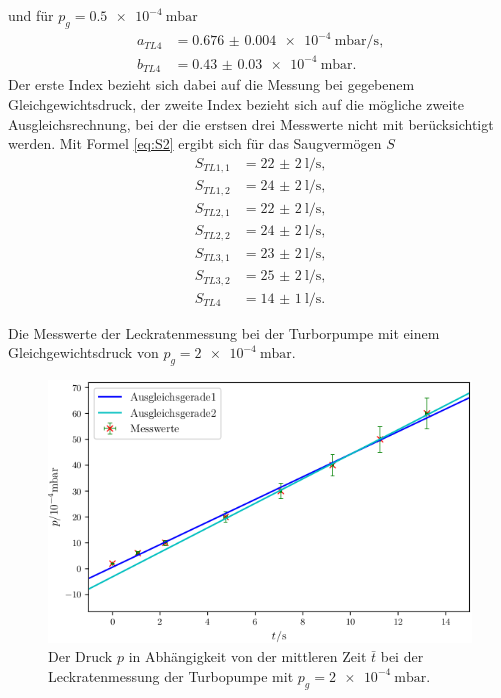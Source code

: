 und für $p_g = \SI{0.5e-4}{\milli\bar}$
\begin{align*}
a_{TL4} &= \SI{0.676(4)e-4}{\milli\bar\per\second} \text{,}\\
b_{TL4} &= \SI{0.43(3)e-4}{\milli\bar} \text{.}
\end{align*}
Der erste Index bezieht sich dabei auf die Messung bei gegebenem Gleichgewichtsdruck, der zweite Index bezieht sich auf die mögliche zweite Ausgleichsrechnung, bei der die erstsen drei Messwerte nicht mit berücksichtigt werden.
Mit Formel \ref{eq:S2} ergibt sich für das Saugvermögen $S$
\begin{align*}
S_{TL1,1} &= \SI{22(2)}{\litre\per\second} \text{,}\\
S_{TL1,2} &= \SI{24(2)}{\litre\per\second} \text{,}\\
S_{TL2,1} &= \SI{22(2)}{\litre\per\second} \text{,}\\
S_{TL2,2} &= \SI{24(2)}{\litre\per\second} \text{,}\\
S_{TL3,1} &= \SI{23(2)}{\litre\per\second} \text{,}\\
S_{TL3,2} &= \SI{25(2)}{\litre\per\second} \text{,}\\
S_{TL4}    &= \SI{14(1)}{\litre\per\second} \text{.}
\end{align*}

\begin{table}
\centering
\caption{Die Messwerte der Leckratenmessung bei der Turborpumpe mit einem Gleichgewichtsdruck von $p_g = \SI{2e-4}{\milli\bar}$.}

\label{tab:TL1}
\end{table}

\begin{figure}
\centering
\includegraphics[width=\linewidth-70pt,height=\textheight-70pt,keepaspectratio]{content/images/TL1.png}
\caption{Der Druck $p$ in Abhängigkeit von der mittleren Zeit $\bar{t}$ bei der Leckratenmessung der Turbopumpe  mit $p_g = \SI{2e-4}{\milli\bar}$.}
\label{fig:TL1}
\end{figure}

